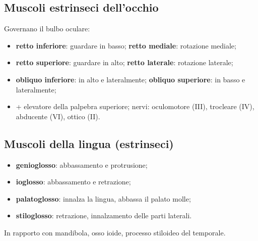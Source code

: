 \subsection{Muscoli estrinseci dell'occhio}
Governano il bulbo oculare:
\begin{itemize}
  \item \textbf{retto inferiore}: guardare in basso; \textbf{retto mediale}: rotazione mediale;
  \item \textbf{retto superiore}: guardare in alto; \textbf{retto laterale}: rotazione laterale;
  \item \textbf{obliquo inferiore}: in alto e lateralmente; \textbf{obliquo superiore}: in basso e
    lateralmente;
  \item + elevatore della palpebra superiore; nervi: oculomotore (III), trocleare (IV), abducente
    (VI), ottico (II).
\end{itemize}

\subsection{Muscoli della lingua (estrinseci)}
\begin{itemize}
  \item \textbf{genioglosso}: abbassamento e protrusione;
  \item \textbf{ioglosso}: abbassamento e retrazione;
  \item \textbf{palatoglosso}: innalza la lingua, abbassa il palato molle;
  \item \textbf{stiloglosso}: retrazione, innalzamento delle parti laterali.
\end{itemize}
In rapporto con mandibola, osso ioide, processo stiloideo del temporale.

